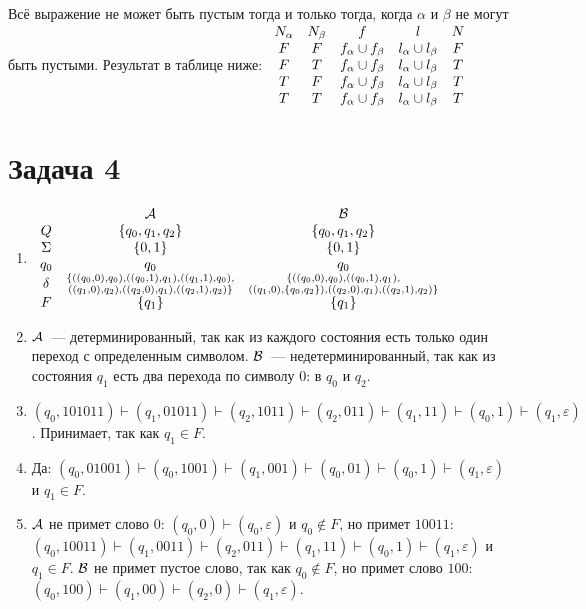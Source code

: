 \documentclass[a4paper]{article}
\begin{document}
\begin{enumerate}
Всё выражение не может быть пустым тогда и только тогда, когда $\alpha$ и $\beta$ не могут быть пустыми. Результат в таблице ниже:
$
\newline
\begin{array}{ccccc}
N_\alpha & N_\beta & f & l & N\\
F & F & f_\alpha \cup f_\beta & l_\alpha \cup l_\beta & F \\
F & T & f_\alpha \cup f_\beta & l_\alpha \cup l_\beta & T\\
T & F & f_\alpha \cup f_\beta & l_\alpha \cup l_\beta & T\\
T & T & f_\alpha \cup f_\beta & l_\alpha \cup l_\beta & T\\
\end{array}
$
\end{enumerate}
\section*{Задача 4}
\begin{enumerate}[1.]
\item $\begin{array}{ccc}
& {\cal A} & {\cal B} \\
Q & \{q_0,q_1,q_2\} & \{q_0,q_1,q_2\}\\
\Sigma & \{0,1\} & \{0,1\}\\
q_0 & q_0 & q_0\\
\delta & \substack{\{((q_0,0),q_0),((q_0,1),q_1),((q_1,1),q_0),\\((q_1,0),q_2),((q_2,0),q_1),((q_2,1),q_2)\}} & \substack{\{((q_0,0),q_0),((q_0,1),q_1),\\((q_1,0),\{q_0,q_2\}),((q_2,0),q_1),((q_2,1),q_2)\}}\\
F & \{q_1\} & \{q_1\}\\
\end{array}$
\item ${\cal A}$~--- детерминированный, так как из каждого состояния есть только один переход с определенным символом.\newline
${\cal B}$~--- недетерминированный, так как из состояния $q_1$ есть два перехода по символу $0$: в $q_0$ и $q_2$.
\item $(q_0,101011)\vdash(q_1,01011)\vdash(q_2,1011)\vdash(q_2,011)\vdash(q_1,11)\vdash(q_0,1)\vdash(q_1,\varepsilon)$. Принимает, так как $q_1\in F$.
\item Да: $(q_0,01001)\vdash(q_0,1001)\vdash(q_1,001)\vdash(q_0,01)\vdash(q_0,1)\vdash(q_1,\varepsilon)$ и $q_1\in F$.
\item ${\cal A}$ не примет слово $0$: $(q_0,0)\vdash(q_0,\varepsilon)$ и $q_0\notin F$, но примет $10011$: $(q_0,10011)\vdash(q_1,0011)\vdash(q_2,011)\vdash(q_1,11)\vdash(q_0,1)\vdash(q_1,\varepsilon)$ и $q_1\in F$.\newline
${\cal B}$ не примет пустое слово, так как $q_0\notin F$, но примет слово $100$: $(q_0,100)\vdash(q_1,00)\vdash(q_2,0)\vdash(q_1,\varepsilon)$.
\end{enumerate}
\newpage
\end{document}
